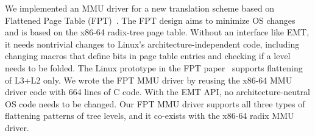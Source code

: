 We implemented an MMU driver for a new translation scheme based on Flattened Page Table (FPT)~\cite{park2022fpt}.
The FPT design aims to minimize OS changes~\cite{Vougioukas2022fpt} and is based on the x86-64 radix-tree page table.
Without an interface like EMT, it needs nontrivial changes to Linux's architecture-independent code,
	including changing macros that define bits in page table entries and checking 
	if a level needs to be folded.
The Linux prototype in the FPT paper~\cite{park2022fpt} supports flattening of L3+L2 only.
We wrote the FPT MMU driver by reusing the x86-64 MMU driver code with 664 lines of C code.
With the EMT API, no architecture-neutral OS code needs to be changed.
Our FPT MMU driver supports all three types of flattening patterns of tree levels,
and it co-exists with the x86-64 radix MMU driver.




